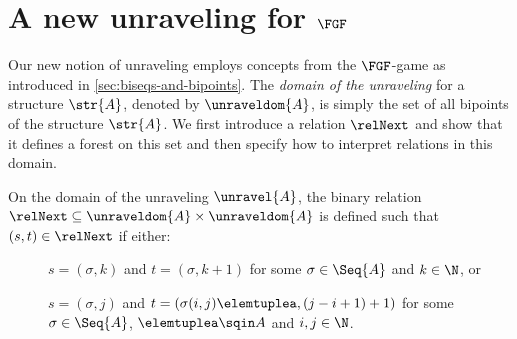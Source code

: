 \section{A new unraveling for $\FGF$}
Our new notion of unraveling employs concepts from the $\FGF$-game as introduced in \cref{sec:biseqs-and-bipoints}.
The \emph{domain of the unraveling} for a structure $\str{A}$, denoted by $\unraveldom{A}$, is simply the set of all bipoints of the structure $\str{A}$.
We first introduce a relation $\relNext$ and show that it defines a forest on this set and then specify how to interpret relations in this domain.

\begin{definition}
On the domain of the unraveling $\unravel{A}$, the binary relation $\relNext \subseteq \unraveldom{A} \times \unraveldom{A}$ is defined such that $(s, t) \in \relNext$ if either:
\begin{description}
  \item[] $s = (\sigma, k)$ and $t = (\sigma, k + 1)$ for some $\sigma \in \Seq{A}$ and $k \in \N$, or
  \item[] $s = (\sigma, j)$ and $t = (\sigma(i,j)\elemtuplea, (j-i+1) + 1)$ for some $\sigma \in \Seq{A}$, $\elemtuplea \sqin A$ and $i,j \in \N$.
\end{description}
\end{definition}
